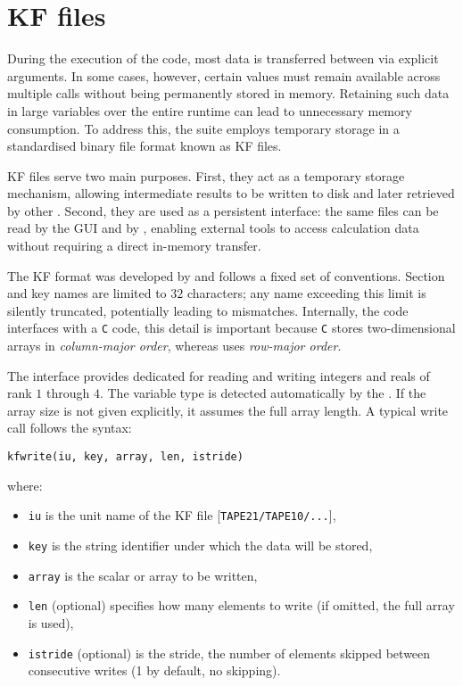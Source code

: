 \newpage
\section{KF files}\label{rkf_files}

During the execution of the \ams code, most data is transferred between
\fortran \subroutines via explicit arguments. In some cases, however, certain
values must remain available across multiple calls without being permanently
stored in memory. Retaining such data in large variables over the entire
runtime can lead to unnecessary memory consumption. To address this, the
suite employs temporary storage in a standardised binary file format known
as KF files.

KF files serve two main purposes. First, they act as a temporary storage
mechanism, allowing intermediate results to be written to disk and later
retrieved by other \subroutines. Second, they are used as a persistent
interface: the same files can be read by the \gls{GUI} and by \plams, enabling
external tools to access calculation data without requiring a direct in-memory
transfer.

The KF format was developed by \scm and follows a fixed set of conventions.
Section and key names are limited to $32$ characters; any name exceeding this
limit is silently truncated, potentially leading to mismatches.  Internally,
the \fortran code interfaces with a \texttt{C} code, this detail is important
because \texttt{C} stores two-dimensional arrays in \textit{column-major
order}, whereas \fortran uses \textit{row-major order}.

The \fortran interface provides dedicated \subroutines for reading and
writing integers and reals of rank $1$ through $4$. The variable type is
detected automatically by the \subroutine. If the array size is not given
explicitly, it assumes the full array length. A typical write call
follows the syntax:

\begingroup
{}
\begin{verbatim}
kfwrite(iu, key, array, len, istride)
\end{verbatim}
where:
\begin{itemize}[itemsep=0.01em]
  \item \texttt{iu} is the unit name of the KF file [\texttt{TAPE21/TAPE10/...}],
  \item \texttt{key} is the string identifier under which the data will be
        stored,
  \item \texttt{array} is the scalar or array to be written,
  \item \texttt{len} (optional) specifies how many elements to write (if
        omitted, the full array is used),
  \item \texttt{istride} (optional) is the stride, \ie the number of elements skipped
        between consecutive writes (1 by default, no skipping).
\end{itemize}
\endgroup

